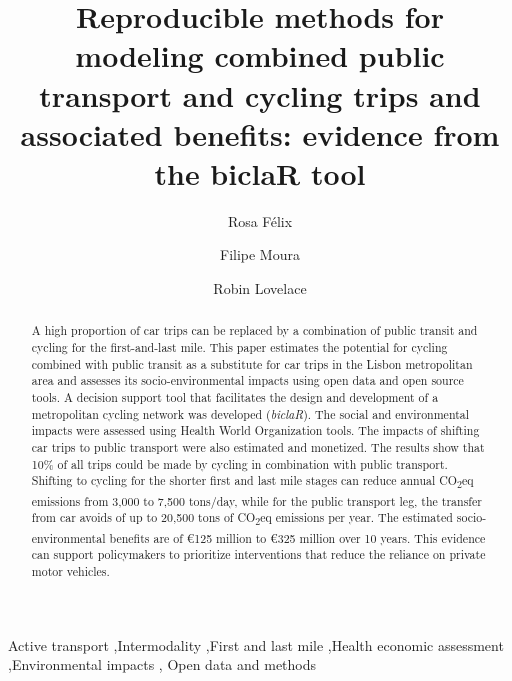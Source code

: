 \documentclass[review, doubleblind, 3p,
authoryear]{elsarticle} %
\begin{document}
\begin{frontmatter}

  \title{Reproducible methods for modeling combined public transport and
cycling trips and associated benefits: evidence from the biclaR tool}
    \author[CERIS]{Rosa Félix%
  }
    \author[CERIS]{Filipe Moura%
  }
    \author[ITS]{Robin Lovelace%
  }

  \begin{abstract}
  A high proportion of car trips can be replaced by a combination of
  public transit and cycling for the first-and-last mile. This paper
  estimates the potential for cycling combined with public transit as a
  substitute for car trips in the Lisbon metropolitan area and assesses
  its socio-environmental impacts using open data and open source tools.
  A decision support tool that facilitates the design and development of
  a metropolitan cycling network was developed (\emph{biclaR}). The
  social and environmental impacts were assessed using Health World
  Organization tools. The impacts of shifting car trips to public
  transport were also estimated and monetized. The results show that
  10\% of all trips could be made by cycling in combination with public
  transport. Shifting to cycling for the shorter first and last mile
  stages can reduce annual CO\textsubscript{2}eq emissions from 3,000 to
  7,500 tons/day, while for the public transport leg, the transfer from
  car avoids of up to 20,500 tons of CO\textsubscript{2}eq emissions per
  year. The estimated socio-environmental benefits are of €125 million
  to €325 million over 10 years. This evidence can support policymakers
  to prioritize interventions that reduce the reliance on private motor
  vehicles.\\
  \end{abstract}
    \begin{keyword}
    Active transport \sep Intermodality \sep First and last
mile \sep Health economic assessment \sep Environmental impacts \sep 
    Open data and methods
  \end{keyword}

 \end{frontmatter}
\end{document}
